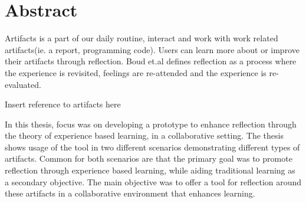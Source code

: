 \chapter*{Abstract}
Artifacts is a part of our daily routine, interact and work with work related artifacts(ie. a report, programming code). Users can learn more about or improve their artifacts through reflection. Boud et.al defines reflection as a process where the experience is revisited, feelings are re-attended and the experience is re-evaluated\cite{boudreflection1985}. 

Insert reference to artifacts here

In this thesis, focus was on developing a prototype to enhance reflection through the theory of experience based learning, in a collaborative setting. The thesis shows usage of the tool in two different scenarios demonstrating different types of artifacts. Common for both scenarios are that the primary goal was to promote reflection through experience based learning, while aiding traditional learning as a secondary objective. 
The main objective was to offer a tool for reflection around these artifacts in a collaborative environment that enhances learning. 